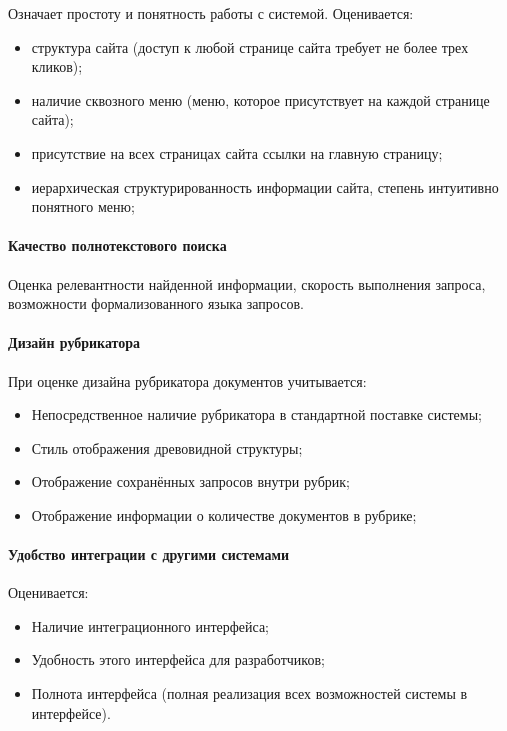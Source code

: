 Означает простоту и понятность работы с системой. Оценивается:
\begin{itemize}
\item структура сайта (доступ к любой странице сайта требует не более трех кликов);
\item наличие сквозного меню (меню, которое присутствует на каждой странице сайта);
\item присутствие на всех страницах сайта ссылки на главную страницу;
\item иерархическая структурированность информации сайта, степень интуитивно понятного меню;
\end{itemize}

\paragraph{Качество полнотекстового поиска}
Оценка релевантности найденной информации, скорость выполнения запроса, возможности формализованного языка запросов.

\paragraph{Дизайн рубрикатора}
При оценке дизайна рубрикатора документов учитывается:
\begin{itemize}
\item Непосредственное наличие рубрикатора в стандартной поставке системы;
\item Стиль отображения древовидной структуры;
\item Отображение сохранённых запросов внутри рубрик;
\item Отображение информации о количестве документов в рубрике;
\end{itemize}

\paragraph{Удобство интеграции с другими системами} 
Оценивается:
\begin{itemize}
\item Наличие интеграционного интерфейса;
\item Удобность этого интерфейса для разработчиков;
\item Полнота интерфейса (полная реализация всех возможностей системы в интерфейсе).
\end{itemize}


